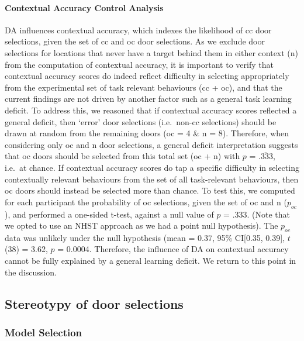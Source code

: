 \documentclass{article}
\begin{document}
\hypertarget{contextual-accuracy-control-analysis}{%
\paragraph{Contextual Accuracy Control
Analysis}\label{contextual-accuracy-control-analysis}}

DA influences contextual accuracy, which indexes the likelihood of cc
door selections, given the set of cc and oc door selections. As we
exclude door selections for locations that never have a target behind
them in either context (n) from the computation of contextual accuracy,
it is important to verify that contextual accuracy scores do indeed
reflect difficulty in selecting appropriately from the experimental set
of task relevant behaviours (cc + oc), and that the current findings are
not driven by another factor such as a general task learning deficit. To
address this, we reasoned that if contextual accuracy scores reflected a
general deficit, then `error' door selections (i.e.~non-cc selections)
should be drawn at random from the remaining doors (oc = 4 \& n = 8).
Therefore, when considering only oc and n door selections, a general
deficit interpretation suggests that oc doors should be selected from
this total set (oc + n) with \(p\) = \(\overline{.333}\), i.e.~at
chance. If contextual accuracy scores do tap a specific difficulty in
selecting contextually relevant behaviours from the set of all
task-relevant behaviours, then oc doors should instead be selected more
than chance. To test this, we computed for each participant the
probability of oc selections, given the set of oc and n (\(p_{oc}\)),
and performed a one-sided t-test, against a null value of \(p\) = .333.
(Note that we opted to use an NHST approach as we had a point null
hypothesis). The \(p_{oc}\) data was unlikely under the null hypothesis
(mean = 0.37, 95\% CI{[}0.35, 0.39{]}, \(t\)(38) = 3.62, \(p\) = 0.0004.
Therefore, the influence of DA on contextual accuracy cannot be fully
explained by a general learning deficit. We return to this point in the
discussion.

\hypertarget{stereotypy-of-door-selections}{%
\subsection{Stereotypy of door
selections}\label{stereotypy-of-door-selections}}

\hypertarget{model-selection-2}{%
\subsubsection{Model Selection}\label{model-selection-2}}
\end{document}
